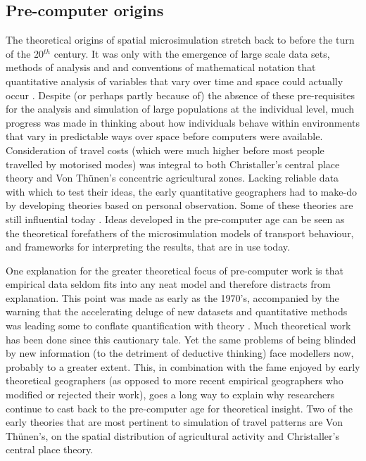 \subsection{Pre-computer origins}
The theoretical origins of spatial microsimulation stretch back to before the
turn of the 20$^{th}$ century. It was only with the emergence of large scale
data sets, methods of analysis and and conventions of mathematical notation that
quantitative analysis of variables that vary over time and space could actually
occur \citep{Ballas2009-sage}.
Despite (or perhaps partly because of) the absence of these pre-requisites for
the analysis and simulation of large populations at the individual level, much
progress was made in thinking about how individuals behave within environments
that vary in predictable ways over space before computers were available.
Consideration of travel costs (which were much higher before most
people travelled by motorised modes) was integral to both Christaller's
central place theory and Von Th\"{u}nen's concentric agricultural zones.
Lacking reliable data with which to test their ideas, the
early quantitative geographers had to make-do by
developing theories based on personal observation.
Some of these theories are still influential today \citep{Clarke1985}.
Ideas developed in the pre-computer age can be seen as the theoretical
forefathers of the microsimulation models of transport behaviour, and frameworks
for interpreting the results, that are in use today.

One explanation for the greater theoretical focus of pre-computer work
is that empirical data seldom fits into any neat model and therefore
distracts from explanation.
This point was made as early as the 1970's, accompanied by the
warning that the
accelerating deluge of new datasets and quantitative methods was leading some
to conflate quantification with theory \citep{Wilson1972-theoretical}.
Much theoretical work has been done since this cautionary tale. Yet the
same problems of being blinded by new information (to the detriment of
deductive thinking) face modellers now, probably to a greater extent.
This, in combination with the fame enjoyed by early theoretical geographers
(as opposed to more recent empirical geographers who modified or
rejected their work), goes a long way to explain why researchers continue to cast back to
the pre-computer age for theoretical
insight. Two of the early theories that are most pertinent to
simulation of travel patterns are Von Th\"{u}nen's, on the
spatial distribution of
agricultural activity and Christaller's central place theory.

